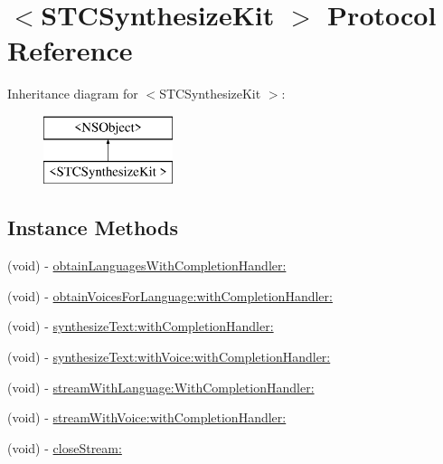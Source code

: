 \hypertarget{protocol_s_t_c_synthesize_kit_01-p}{}\section{$<$S\+T\+C\+Synthesize\+Kit $>$ Protocol Reference}
\label{protocol_s_t_c_synthesize_kit_01-p}
Inheritance diagram for $<$S\+T\+C\+Synthesize\+Kit $>$\+:\begin{figure}[H]
\begin{center}
\leavevmode
\includegraphics[height=2.000000cm]{protocol_s_t_c_synthesize_kit_01-p}
\end{center}
\end{figure}
\subsection*{Instance Methods}
\begin{DoxyCompactItemize}
\item 
(void) -\/ \hyperlink{protocol_s_t_c_synthesize_kit_01-p_a1679a8853f228bf9799eaa8ed1a49c09}{obtain\+Languages\+With\+Completion\+Handler\+:}
\item 
(void) -\/ \hyperlink{protocol_s_t_c_synthesize_kit_01-p_a8c6e4b0dd69c33d0044135976941a706}{obtain\+Voices\+For\+Language\+:with\+Completion\+Handler\+:}
\item 
(void) -\/ \hyperlink{protocol_s_t_c_synthesize_kit_01-p_a2257422be5b0fbb23cf7375230f37b77}{synthesize\+Text\+:with\+Completion\+Handler\+:}
\item 
(void) -\/ \hyperlink{protocol_s_t_c_synthesize_kit_01-p_abcd4795f4fbd306d88e12a48d0b2c504}{synthesize\+Text\+:with\+Voice\+:with\+Completion\+Handler\+:}
\item 
(void) -\/ \hyperlink{protocol_s_t_c_synthesize_kit_01-p_a99ae6df6d921250b4bfe2c20e0dfbf97}{stream\+With\+Language\+:\+With\+Completion\+Handler\+:}
\item 
(void) -\/ \hyperlink{protocol_s_t_c_synthesize_kit_01-p_a979b7ce63513807b589cf3832a985aad}{stream\+With\+Voice\+:with\+Completion\+Handler\+:}
\item 
(void) -\/ \hyperlink{protocol_s_t_c_synthesize_kit_01-p_a19fc7385dd0948bc99b9cbe92470671b}{close\+Stream\+:}
\end{DoxyCompactItemize}


